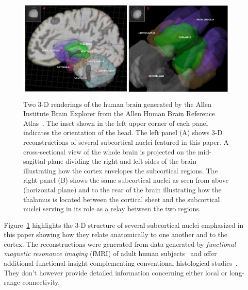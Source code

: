 \documentclass[letterpaper,11pt]{article}
\def\colorred#1{{\color{red}#1}}
\def\urlh#1{{}}
\begin{document}
\begin{figure}
%
  \begin{center} 
    \includegraphics[height=150pt]{./figures/Human_Brain_Atlas_Allen_Institute.jpg} %
  \end{center}
%
  \caption{Two 3-D renderings of the human brain generated by the Allen Institute {\urlh{ttp://human.brain-map.org/static/brainexplorer}{Brain Explorer}} from the Allen Human Brain Reference Atlas~\cite{HawrylyczetalNATURE-12}. The inset shown in the left upper corner of each panel indicates the orientation of the head. The left panel ({\colorred{A}}) shows 3-D reconstructions of several subcortical nuclei featured in this paper. A cross-sectional view of the whole brain is projected on the mid-sagittal plane dividing the right and left sides of the brain illustrating how the cortex envelopes the subcortical regions. The right panel ({\colorred{B}}) shows the same subcortical nuclei as seen from above (horizontal plane) and to the rear of the brain illustrating how the thalamus is located between the cortical sheet and the subcortical nuclei serving in its role as a relay between the two regions.}
%
  \label{fig_brains}
%
\end{figure}


Figure~{\urlh{#fig_Human_Brain_Atlas_Allen_Institute}{\ref{fig_brains}}} highlights the 3-D structure of several subcortical nuclei emphasized in this paper showing how they relate anatomically to one another and to the cortex. The reconstructions were generated from data generated by {\it{functional magnetic resonance imaging}} (fMRI) of adult human subjects~\cite{HawrylyczetalNATURE-12} and offer additional functional insight complementing conventional histological studies~\cite{BridgeandClarePTRS-B-06}. They don't however provide detailed information concerning either local or long-range connectivity.
\end{document}
